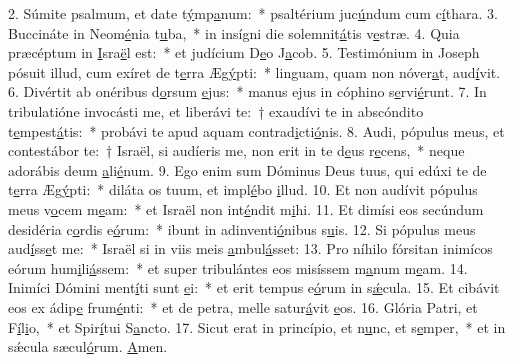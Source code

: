 2. Súmite psalmum, et date t\uline{ý}mp\uline{a}num:~* psaltérium juc\uline{ú}ndum cum c\uline{í}thara.
3. Buccináte in Neom\uline{é}nia t\uline{u}ba,~* in insígni die solemnit\uline{á}tis v\uline{e}stræ.
4. Quia præcéptum in \uline{I}sra\uline{ë}l est:~* et judícium D\uline{e}o J\uline{a}cob.
5. Testimónium in Joseph pósuit illud, cum exíret de t\uline{e}rra Æg\uline{ý}pti:~* linguam, quam non nóver\uline{a}t, aud\uline{í}vit.
6. Divértit ab onéribus d\uline{o}rsum \uline{e}jus:~* manus ejus in cóphino s\uline{e}rvi\uline{é}runt.
7. In tribulatióne invocásti me, et liberávi te:~† exaudívi te in abscóndito t\uline{e}mpest\uline{á}tis:~* probávi te apud aquam contrad\uline{i}cti\uline{ó}nis.
8. Audi, pópulus meus, et contestábor te:~† Israël, si audíeris me, non erit in te d\uline{e}us r\uline{e}cens,~* neque adorábis deum \uline{a}li\uline{é}num.
9. Ego enim sum Dóminus Deus tuus, qui edúxi te de t\uline{e}rra Æg\uline{ý}pti:~* diláta os tuum, et impl\uline{é}bo \uline{i}llud.
10. Et non audívit pópulus meus v\uline{o}cem m\uline{e}am:~* et Israël non int\uline{é}ndit m\uline{i}hi.
11. Et dimísi eos secúndum desidéria c\uline{o}rdis e\uline{ó}rum:~* ibunt in adinventi\uline{ó}nibus s\uline{u}is.
12. Si pópulus meus aud\uline{í}ss\uline{e}t me:~* Israël si in viis meis \uline{a}mbul\uline{á}sset:
13. Pro níhilo fórsitan inimícos eórum hum\uline{i}li\uline{á}ssem:~* et super tribulántes eos misíssem m\uline{a}num m\uline{e}am.
14. Inimíci Dómini ment\uline{í}ti sunt \uline{e}i:~* et erit tempus e\uline{ó}rum in s\uline{ǽ}cula.
15. Et cibávit eos ex ádip\uline{e} frum\uline{é}nti:~* et de petra, melle satur\uline{á}vit \uline{e}os.
16. Glória Patri, et F\uline{í}l\uline{i}o,~* et Spir\uline{í}tui S\uline{a}ncto.
17. Sicut erat in princípio, et n\uline{u}nc, et s\uline{e}mper,~* et in sǽcula sæcul\uline{ó}rum. \uline{A}men.
